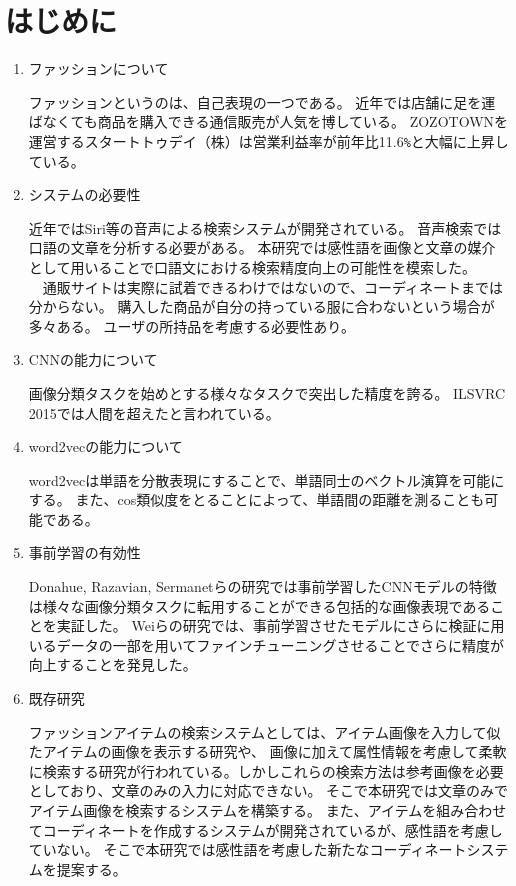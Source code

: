 \chapter{はじめに}

\begin{enumerate}

  \item ファッションについて

  ファッションというのは、自己表現の一つである。
  近年では店舗に足を運ばなくても商品を購入できる通信販売が人気を博している。
  ZOZOTOWNを運営するスタートトゥデイ（株）は営業利益率が前年比11.6\verb|%|と大幅に上昇している。

  \item システムの必要性

  近年ではSiri等の音声による検索システムが開発されている。
  音声検索では口語の文章を分析する必要がある。
  本研究では感性語を画像と文章の媒介として用いることで口語文における検索精度向上の可能性を模索した。
  \\
  　通販サイトは実際に試着できるわけではないので、コーディネートまでは分からない。
  購入した商品が自分の持っている服に合わないという場合が多々ある。
  ユーザの所持品を考慮する必要性あり。

  \item CNNの能力について

  画像分類タスクを始めとする様々なタスクで突出した精度を誇る。
  ILSVRC 2015では人間を超えたと言われている。

  \item word2vecの能力について

  word2vecは単語を分散表現にすることで、単語同士のベクトル演算を可能にする。
  また、cos類似度をとることによって、単語間の距離を測ることも可能である。

  \item 事前学習の有効性

  Donahue, Razavian, Sermanetらの研究では事前学習したCNNモデルの特徴は様々な画像分類タスクに転用することができる包括的な画像表現であることを実証した。
  Weiらの研究では、事前学習させたモデルにさらに検証に用いるデータの一部を用いてファインチューニングさせることでさらに精度が向上することを発見した。

  \item 既存研究

  ファッションアイテムの検索システムとしては、アイテム画像を入力して似たアイテムの画像を表示する研究や、
  画像に加えて属性情報を考慮して柔軟に検索する研究が行われている。しかしこれらの検索方法は参考画像を必要としており、文章のみの入力に対応できない。
  そこで本研究では文章のみでアイテム画像を検索するシステムを構築する。
  また、アイテムを組み合わせてコーディネートを作成するシステムが開発されているが、感性語を考慮していない。
  そこで本研究では感性語を考慮した新たなコーディネートシステムを提案する。


\end{enumerate}
